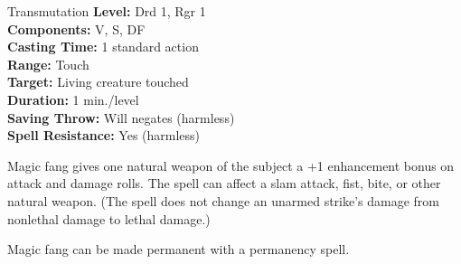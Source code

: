{Transmutation}
{
	\textbf{Level:}
	Drd 1, Rgr 1\\
	\textbf{Components:}
	V, S, DF\\
	\textbf{Casting Time:}
	1 standard action\\
	\textbf{Range:}
	Touch\\
	\textbf{Target:}
	Living creature touched\\
	\textbf{Duration:}
	1 min./level\\
	\textbf{Saving Throw:}
	Will negates (harmless)\\
	\textbf{Spell Resistance:}
	Yes (harmless)\\
}
{
	Magic fang gives one natural weapon of the subject a +1 enhancement bonus on attack and damage rolls. The spell can affect a slam attack, fist, bite, or other natural weapon. (The spell does not change an unarmed strike's damage from nonlethal damage to lethal damage.)

	Magic fang can be made permanent with a permanency spell.

}
